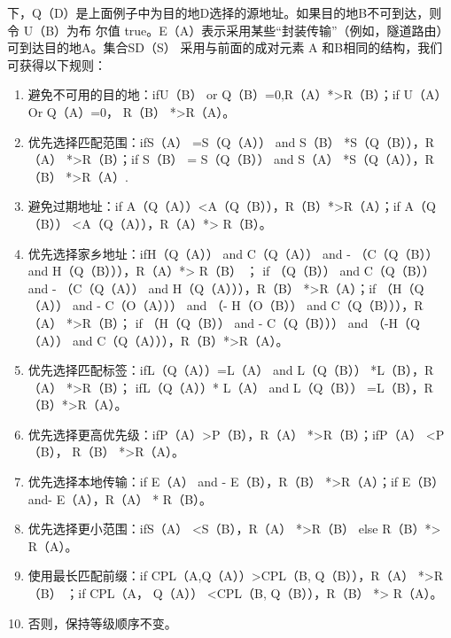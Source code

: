 下，Q（D）是上面例子中为目的地D选择的源地址。如果目的地B不可到达，则令 U（B）为布
尔值 true。E（A）表示采用某些“封装传输”（例如，隧道路由）可到达目的地A。集合SD（S）
采用与前面的成对元素 A 和B相同的结构，我们可获得以下规则：

\begin{enumerate}
    \item 避免不可用的目的地：ifU（B） or Q（B）=0,R（A）*>R（B）；if U（A） Or Q（A）=0，
    R（B） *>R（A）。
    
    \item 优先选择匹配范围：ifS（A） =S（Q（A）） and S（B） *S（Q（B）），R（A） *>R（B）；if
    S（B） = S（Q（B）） and S（A） *S（Q（A）），R（B） *>R（A）.
    
    \item 避免过期地址：if A（Q（A））<A（Q（B）），R（B）*>R（A）；if A（Q（B）） <A（Q（A）），R（A）*>
    R（B）。
    
    \item 优先选择家乡地址：ifH（Q（A）） and C（Q（A）） and - （C（Q（B）） and H（Q（B））），R（A）*>
    R（B） ； if （Q（B）） and C（Q（B）） and - （C（Q（A）） and H（Q（A））），R（B） *>R（A）；if （H（Q（A）） and -
    C（O（A））） and （- H（O（B）） and C（Q（B））），R（A） *>R（B）； if （H（Q（B）） and - C（Q（B））） and （-H（Q（A））
    and C（Q（A））），R（B）*>R（A）。
    
    \item 优先选择匹配标签：ifL（Q（A））=L（A） and L（Q（B）） *L（B），R（A） *>R（B）； ifL（Q（A））*
    L（A） and L（Q（B）） =L（B），R（B）*>R（A）。
    
    \item 优先选择更高优先级：ifP（A）>P（B），R（A） *>R（B）；ifP（A） <P（B）， R（B） *>R（A）。
    
    \item 优先选择本地传输：if E（A） and - E（B），R（B） *>R（A）；if E（B） and- E（A），R（A） *
    R（B）。
    
    \item 优先选择更小范围：ifS（A） <S（B），R（A） *>R（B） else R（B）*> R（A）。
    
    \item 使用最长匹配前缀：if CPL（A,Q（A））>CPL（B, Q（B）），R（A） *>R（B） ；if CPL（A，
    Q（A）） <CPL（B, Q（B）），R（B） *> R（A）。
    
    \item 否则，保持等级顺序不变。
\end{enumerate}

